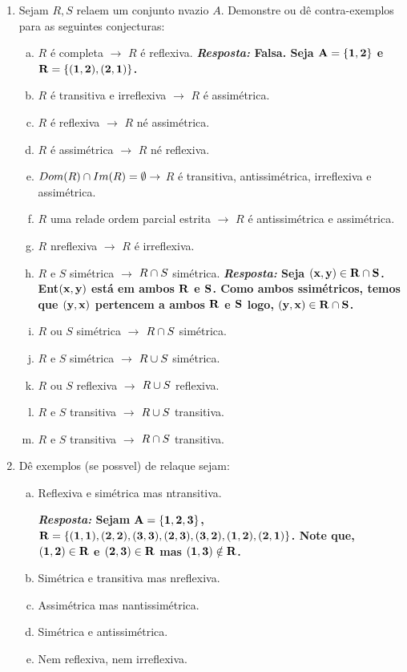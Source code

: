 \begin{enumerate}[{\bf 1.}]
\item Sejam $R,S$ rela\coes em um conjunto n\ao vazio $A$. Demonstre ou d\^e contra-exemplos para as seguintes conjecturas:
\begin{enumerate}[a)]
\item $R$ \'e completa $\to$ $R$ \'e reflexiva. {\bf{\it Resposta:} Falsa. Seja ${\bf A=\{1,2\}}$ e ${\bf R=\{(1,2),(2,1)\}}$.}
\item $R$ \'e transitiva e irreflexiva $\to$ $R$ \'e assim\'etrica.
\item $R$ \'e reflexiva $\to$ $R$ n\ao \'e assim\'etrica. 
\item $R$ \'e assim\'etrica $\to$ $R$ n\ao \'e reflexiva.
\item $Dom(R)\cap Im(R)=\emptyset\to$ $R$ \'e transitiva, antissim\'etrica, irreflexiva e assim\'etrica.
\item $R$ uma rela\cao de ordem parcial estrita $\to$ $R$ \'e antissim\'etrica e assim\'etrica. 
\item $R$ n\ao reflexiva $\to$ $R$ \'e irreflexiva.
\item $R$ e $S$ sim\'etrica $\to$ $R\cap S$ sim\'etrica. {\bf{\it Resposta:} Seja ${\bf (x,y)\in R\cap S}$. Ent\ao ${\bf (x,y)}$ est\'a em ambos ${\bf R}$ e ${\bf S}$. Como ambos s\ao sim\'etricos, temos que ${\bf (y,x)}$ pertencem a ambos ${\bf R}$ e ${\bf S}$ logo, ${\bf (y,x)\in R\cap S}$.}
\item $R$ ou $S$ sim\'etrica $\to$ $R\cap S$ sim\'etrica.
\item $R$ e $S$ sim\'etrica $\to$ $R\cup S$ sim\'etrica.
\item $R$ ou $S$ reflexiva $\to$ $R\cup S$ reflexiva.
\item $R$ e $S$ transitiva $\to$ $R\cup S$ transitiva.
\item $R$ e $S$ transitiva $\to$ $R\cap S$ transitiva.
\end{enumerate}

\item D\^e exemplos (se poss\ih vel) de rela\coes que sejam:
\begin{enumerate}[a)]
\item Reflexiva e sim\'etrica mas n\ao transitiva.

{\bf{\it Resposta:} Sejam ${\bf A=\{1,2,3\}}$, ${\bf R=\{(1,1),(2,2),(3,3),(2,3),(3,2),(1,2),(2,1)\}}$. Note que, ${\bf (1,2)\in R}$ e ${\bf (2,3)\in R}$ mas ${\bf (1,3)\notin R}$.}

\item Sim\'etrica e transitiva mas n\ao reflexiva.
\item Assim\'etrica mas n\ao antissim\'etrica.
\item Sim\'etrica e antissim\'etrica.
\item Nem reflexiva, nem irreflexiva.
\end{enumerate}


\end{enumerate}
